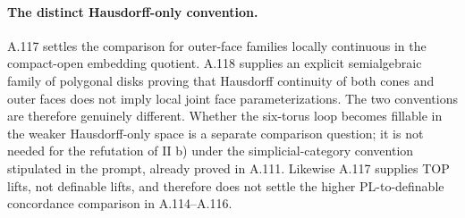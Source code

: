 \paragraph{The distinct Hausdorff-only convention.}
A.117 settles the comparison for outer-face families locally continuous
in the compact-open embedding quotient. A.118 supplies an explicit
semialgebraic family of polygonal disks proving that Hausdorff
continuity of both cones and outer faces does not imply local joint
face parameterizations. The two conventions are therefore genuinely
different. Whether the six-torus loop becomes fillable in the weaker
Hausdorff-only space is a separate comparison question; it is not
needed for the refutation of II b) under the simplicial-category
convention stipulated in the prompt, already proved in A.111.
Likewise A.117 supplies TOP lifts, not definable lifts, and therefore
does not settle the higher PL-to-definable concordance comparison in
A.114--A.116.
